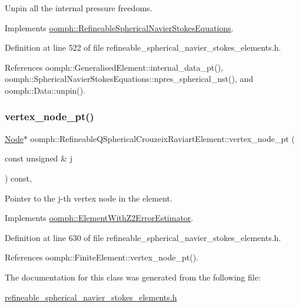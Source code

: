 Unpin all the internal pressure freedoms. 



Implements \hyperlink{classoomph_1_1RefineableSphericalNavierStokesEquations_a6d4b7f91dc9139367408a3b9f067920d}{oomph\+::\+Refineable\+Spherical\+Navier\+Stokes\+Equations}.



Definition at line 522 of file refineable\+\_\+spherical\+\_\+navier\+\_\+stokes\+\_\+elements.\+h.



References oomph\+::\+Generalised\+Element\+::internal\+\_\+data\+\_\+pt(), oomph\+::\+Spherical\+Navier\+Stokes\+Equations\+::npres\+\_\+spherical\+\_\+nst(), and oomph\+::\+Data\+::unpin().

\mbox{\label{classoomph_1_1RefineableQSphericalCrouzeixRaviartElement_ac75e04db8f4da1e84990a2b22c8b19fb}} 
\subsubsection{\texorpdfstring{vertex\+\_\+node\+\_\+pt()}{vertex\_node\_pt()}}
{\footnotesize\ttfamily \hyperlink{classoomph_1_1Node}{Node}$\ast$ oomph\+::\+Refineable\+Q\+Spherical\+Crouzeix\+Raviart\+Element\+::vertex\+\_\+node\+\_\+pt (\begin{DoxyParamCaption}\item[{const unsigned \&}]{j }\end{DoxyParamCaption}) const\hspace{0.3cm}{\ttfamily [inline]}, {\ttfamily [virtual]}}



Pointer to the j-\/th vertex node in the element. 



Implements \hyperlink{classoomph_1_1ElementWithZ2ErrorEstimator_a0eedccc33519f852c5dc2055ddf2774b}{oomph\+::\+Element\+With\+Z2\+Error\+Estimator}.



Definition at line 630 of file refineable\+\_\+spherical\+\_\+navier\+\_\+stokes\+\_\+elements.\+h.



References oomph\+::\+Finite\+Element\+::vertex\+\_\+node\+\_\+pt().



The documentation for this class was generated from the following file\+:\begin{DoxyCompactItemize}
\item 
\hyperlink{refineable__spherical__navier__stokes__elements_8h}{refineable\+\_\+spherical\+\_\+navier\+\_\+stokes\+\_\+elements.\+h}\end{DoxyCompactItemize}
